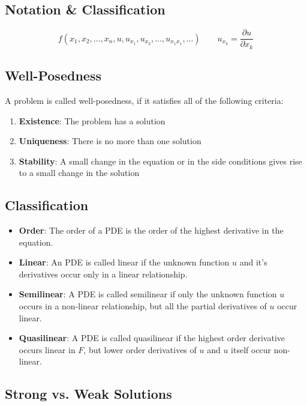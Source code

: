 \documentclass[a4paper]{article}
\begin{document}
\begin{twocolumn} 

\section{Notation \& Classification}

$$f(x_1, x_2, \ldots, x_n, u, u_{x_1}, u_{x_2}, \ldots, u_{x_1x_1}, \ldots) \qquad u_{x_k} = \frac{\partial u}{\partial x_k}$$

\subsection{Well-Posedness}

A problem is called well-posedness, if it satisfies all of the following criteria:
\begin{enumerate}
	\item \textbf{Existence}: The problem has a solution
	\item \textbf{Uniqueness}: There is no more than one solution
	\item \textbf{Stability}: A small change in the equation or in the side conditions gives rise to a small change in the solution
\end{enumerate}

\subsection{Classification}

\begin{itemize}
	\item \textbf{Order}: The order of a PDE is the order of the highest derivative in the equation.
	\item \textbf{Linear}: An PDE is called linear if the unknown function $u$ and it's derivatives occur only in a linear relationship. 
	\item \textbf{Semilinear}: A PDE is called semilinear if only the unknown function $u$ occurs in a non-linear relationship, but all the partial derivatives of $u$ occur linear.
	\item \textbf{Quasilinear}: A PDE is called quasilinear if the highest order derivative occurs linear in $F$, but lower order derivatives of $u$ and $u$ itself occur non-linear.
\end{itemize}

\subsection{Strong vs. Weak Solutions}


\end{twocolumn}
\end{document}
